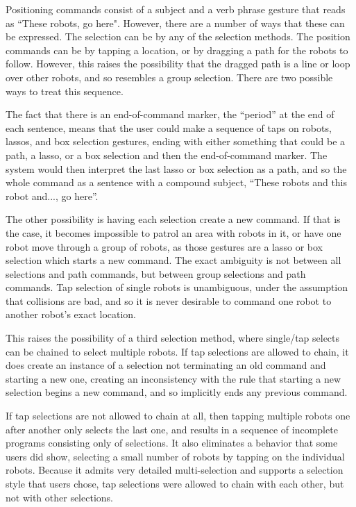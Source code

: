 Positioning commands consist of a subject and a verb phrase gesture that reads as ``These robots, go here". 
However, there are a number of ways that these can be expressed. 
The selection can be by any of the selection methods. 
The position commands can be by tapping a location, or by dragging a path for the robots to follow. 
However, this raises the possibility that the dragged path is a line or loop over other robots, and so resembles a group selection. 
There are two possible ways to treat this sequence. 

The fact that there is an end-of-command marker, the ``period'' at the end of each sentence, means that the user could make a sequence of taps on robots, lassos, and box selection gestures, ending with either something that could be a path, a lasso, or a box selection and then the end-of-command marker. 
The system would then interpret the last lasso or box selection as a path, and so the whole command as a sentence with a compound subject, ``These robots and this robot and..., go here''. 

The other possibility is having each selection create a new command. 
If that is the case, it becomes impossible to patrol an area with robots in it, or have one robot move through a group of robots, as those gestures are a lasso or box selection which starts a new command. 
The exact ambiguity is not between all selections and path commands, but between group selections and path commands.
Tap selection of single robots is unambiguous, under the assumption that collisions are bad, and so it is never desirable to command one robot to another robot's exact location. 

This raises the possibility of a third selection method, where single/tap selects can be chained to select multiple robots. 
If tap selections are allowed to chain, it does create an instance of a selection not terminating an old command and starting a new one, creating an inconsistency with the rule that starting a new selection begins a new command, and so implicitly ends any previous command.

If tap selections are not allowed to chain at all, then tapping multiple robots one after another only selects the last one, and results in a sequence of incomplete programs consisting only of selections. 
It also eliminates a behavior that some users did show, selecting a small number of robots by tapping on the individual robots. 
Because it admits very detailed multi-selection and supports a selection style that users chose, tap selections were allowed to chain with each other, but not with other selections. 

